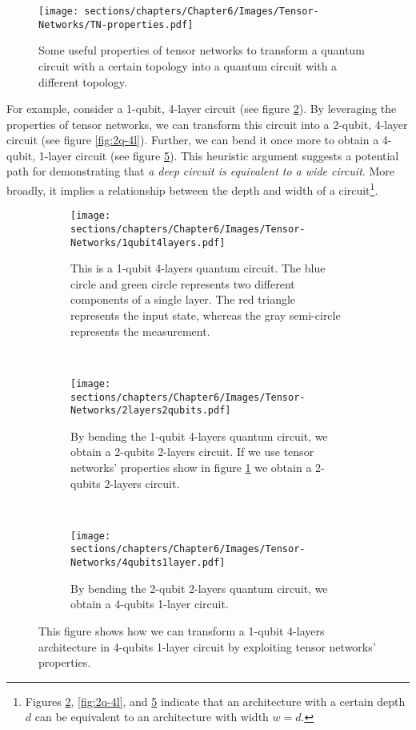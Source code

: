 \begin{itemize}
    \begin{figure}
        \centering
        \texttt{[image: sections/chapters/Chapter6/Images/Tensor-Networks/TN-properties.pdf]}
        \caption{Some useful properties of tensor networks to transform a quantum circuit with a certain 
        topology into a quantum circuit with a different topology.}
        \label{fig:tensor-prop}
    \end{figure}

    For example, consider a 1-qubit, 4-layer circuit (see figure \ref{fig:1q-4l}). By leveraging 
    the properties of tensor networks, we can transform this circuit into a 2-qubit, 4-layer circuit 
    (see figure \ref{fig:2q-4l}). Further, we can bend it once more to obtain a 4-qubit, 
    1-layer circuit (see figure \ref{fig:4q-1l}). This heuristic argument suggests a potential path 
    for demonstrating that \textit{a deep circuit is equivalent to a wide circuit}. 
    More broadly, it implies a relationship between the depth and width of a 
    circuit\footnote[1]{Figures \ref{fig:1q-4l}, \ref{fig:2q-4l}, and \ref{fig:4q-1l} indicate 
    that an architecture with a certain depth $d$ can be equivalent to an architecture with width 
    $w = d$.}.\\

    \begin{figure}[h]
        \centering
        \begin{subfigure}[b]{\textwidth}
            \texttt{[image: sections/chapters/Chapter6/Images/Tensor-Networks/1qubit4layers.pdf]}
        \caption{This is a 1-qubit 4-layers quantum circuit. The blue circle and green circle represents two
        different components of a single layer. The red triangle represents the input state, whereas the 
        gray semi-circle represents the measurement.}
        \label{fig:1q-4l}
        \end{subfigure}
        \\[3ex]
        \begin{subfigure}[b]{\textwidth}
        \centering
            \texttt{[image: sections/chapters/Chapter6/Images/Tensor-Networks/2layers2qubits.pdf]}
        \caption{By bending the 1-qubit 4-layers quantum circuit, we obtain a 2-qubits 2-layers circuit. If 
        we use tensor networks' properties show in figure \ref{fig:tensor-prop} we obtain a 2-qubits 
        2-layers circuit.}
        \label{fig:2q-2l}
        \end{subfigure}
        \\[3ex]
        \begin{subfigure}[b]{\textwidth}
        \centering
            \texttt{[image: sections/chapters/Chapter6/Images/Tensor-Networks/4qubits1layer.pdf]}
        \caption{By bending the 2-qubit 2-layers quantum circuit, we obtain a 4-qubits 1-layer circuit.}
        \label{fig:4q-1l}
        \end{subfigure}
        \caption{This figure shows how we can transform a 1-qubit 4-layers architecture in 4-qubits 1-layer 
        circuit by exploiting tensor networks' properties.}
    \end{figure}

    


\end{itemize}